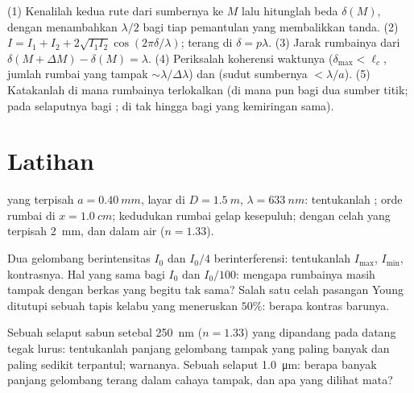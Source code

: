 \begin{method}\label{met:b2:two-wave-interference:method}
(1) Kenalilah kedua rute dari sumbernya ke $M$ lalu hitunglah
beda  $\delta(M)$, dengan menambahkan $\lambda/2$ bagi tiap pemantulan
yang membalikkan tanda. (2) $I = I_1 + I_2 + 2\sqrt{I_1I_2}\cos(2\pi\delta/\lambda)$;
terang di $\delta = p\lambda$. (3) Jarak rumbainya dari $\delta(M + \Delta M) - \delta(M) =
\lambda$. (4) Periksalah koherensi waktunya ($\delta_{\max} < \ell_c$, jumlah
rumbai yang tampak $\sim\lambda/\Delta\lambda$) dan  (sudut sumbernya
$< \lambda/a$). (5) Katakanlah di mana rumbainya terlokalkan (di mana pun bagi dua
sumber titik; pada selaputnya bagi ; di tak hingga
bagi yang kemiringan sama).
\end{method}

\section{Latihan}

\begin{exercise}[$\star$]\label{exo:b2:two-wave-interference:1}
 yang terpisah $a = \qty{0.40}{mm}$, layar di $D = \qty{1.5}{m}$, $\lambda =
\qty{633}{nm}$: tentukanlah ; orde rumbai di $x = \qty{1.0}{cm}$; kedudukan
rumbai gelap kesepuluh;  dengan celah yang terpisah \qty{2}{mm},
dan dalam air ($n = 1.33$).
\end{exercise}

\begin{exercise}[$\star$]\label{exo:b2:two-wave-interference:2}
Dua gelombang berintensitas $I_0$ dan $I_0/4$ berinterferensi: tentukanlah $I_{\max}$, $I_{\min}$,
kontrasnya. Hal yang sama bagi $I_0$ dan $I_0/100$: mengapa rumbainya masih tampak
dengan berkas yang begitu tak sama? Salah satu celah pasangan Young ditutupi sebuah
tapis kelabu yang meneruskan $50\%$: berapa kontras barunya.
\end{exercise}

\begin{exercise}[$\star$]\label{exo:b2:two-wave-interference:3}
Sebuah selaput sabun setebal \qty{250}{nm} ($n = 1.33$) yang dipandang pada datang tegak lurus:
tentukanlah panjang gelombang tampak yang paling banyak dan paling sedikit terpantul; warnanya. Sebuah selaput
\qty{1.0}{\micro m}: berapa banyak panjang gelombang terang dalam cahaya tampak, dan apa
yang dilihat mata?
\end{exercise}

